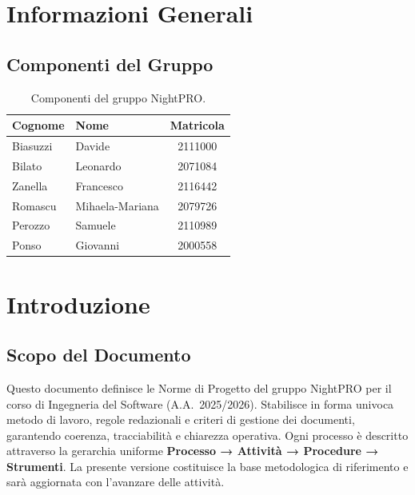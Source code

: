 \documentclass[a4paper, 11pt, oneside]{scrartcl}
\begin{document}
\newpage
\tableofcontents
\pagestyle{fancy}

\newpage
\section{Informazioni Generali}

\subsection{Componenti del Gruppo}

\begin{table}[h!]
    \centering
    \renewcommand{\arraystretch}{1.2}
    \begin{tabular}{@{}llc@{}}
        \toprule
        \textbf{Cognome} & \textbf{Nome}   & \textbf{Matricola} \\
        \midrule
        Biasuzzi         & Davide          & 2111000            \\
        Bilato           & Leonardo        & 2071084            \\
        Zanella          & Francesco       & 2116442            \\
        Romascu          & Mihaela-Mariana & 2079726            \\
        Perozzo          & Samuele         & 2110989            \\
        Ponso            & Giovanni        & 2000558            \\
        \bottomrule
    \end{tabular}
    \caption{Componenti del gruppo NightPRO.}
\end{table}

\newpage
\section{Introduzione}
\label{sec:introduzione}

\subsection{Scopo del Documento}
Questo documento definisce le Norme di Progetto{\scriptsize{}} del gruppo NightPRO per il corso di Ingegneria del Software (A.A.~2025/2026).
Stabilisce in forma univoca metodo di lavoro, regole redazionali e criteri di gestione dei documenti, garantendo coerenza, tracciabilità e chiarezza operativa.
Ogni processo è descritto attraverso la gerarchia uniforme \textbf{Processo → Attività → Procedure → Strumenti}.
La presente versione costituisce la base metodologica di riferimento e sarà aggiornata con l'avanzare delle attività.
\end{document}
